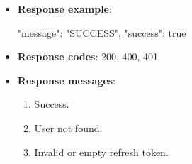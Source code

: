 \begin{itemize}
\begin{itemize}
        \item \textbf{Response example}:

        \begin{spverbatim}
        {
            "message": "SUCCESS",
            "success": true
        }
        \end{spverbatim}

        \item \textbf{Response codes}: 200, 400, 401

        \item \textbf{Response messages}:
        \begin{enumerate}
            \item Success.
            \item User not found.
            \item Invalid or empty refresh token.
        \end{enumerate}
    \end{itemize}

\end{itemize}

